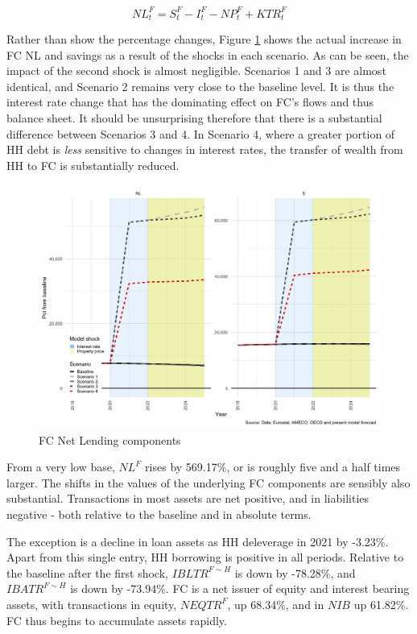 \documentclass[
]{book}
\begin{document}
\begin{equation}
NL^F_t = S^F_t - I^F_t - NP^F_t + KTR^F_t
\end{equation}

Rather than show the percentage changes, Figure \ref{fig:fl-fi-sfc-plot-fc-indicators-nl} shows the actual increase in FC NL and savings as a result of the shocks in each scenario. As can be seen, the impact of the second shock is almost negligible. Scenarios 1 and 3 are almost identical, and Scenario 2 remains very close to the baseline level. It is thus the interest rate change that has the dominating effect on FC's flows and thus balance sheet. It should be unsurprising therefore that there is a substantial difference between Scenarios 3 and 4. In Scenario 4, where a greater portion of HH debt is \emph{less} sensitive to changes in interest rates, the transfer of wealth from HH to FC is substantially reduced.

\begin{figure}[H]
\includegraphics[width=0.95\linewidth]{figures/fl-fi-sfc-plot-fc-indicators-nl-1} \caption{FC Net Lending components}\label{fig:fl-fi-sfc-plot-fc-indicators-nl}
\end{figure}

From a very low base, \(NL^F\) rises by 569.17\%, or is roughly five and a half times larger. The shifts in the values of the underlying FC components are sensibly also substantial. Transactions in most assets are net positive, and in liabilities negative - both relative to the baseline and in absolute terms.

The exception is a decline in loan assets as HH deleverage in 2021 by -3.23\%. Apart from this single entry, HH borrowing is positive in all periods. Relative to the baseline after the first shock, \(IBLTR^{F\sim H}\) is down by -78.28\%, and \(IBATR^{F\sim H}\) is down by -73.94\%. FC is a net issuer of equity and interest bearing assets, with transactions in equity, \(NEQTR^F\), up 68.34\%, and in \(NIB\) up 61.82\%. FC thus begins to accumulate assets rapidly.
\end{document}
